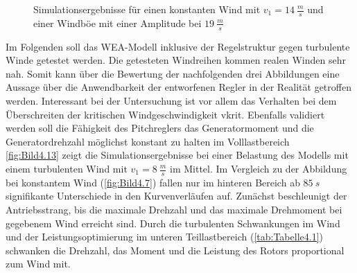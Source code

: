 \begin{figure}[H]
   \centering
   \caption[Windböensimulation bei schnellem Wind]{Simulationsergebnisse für einen konstanten Wind mit $v_1 = \SI{14}{\frac{m}{s}}$ und einer Windböe mit einer Amplitude bei $\SI{19}{\frac{m}{s}}$}
   \label{fig:Bild4.12}
\end{figure}


Im Folgenden soll das WEA-Modell inklusive der Regelstruktur gegen turbulente Winde getestet werden. Die getesteten Windreihen kommen realen Winden sehr nah. Somit kann über die Bewertung der nachfolgenden drei Abbildungen eine Aussage über die Anwendbarkeit der entworfenen Regler in der Realität getroffen werden. Interessant bei der Untersuchung ist vor allem das Verhalten bei dem Überschreiten der kritischen Windgeschwindigkeit \acs{vkrit}. Ebenfalls validiert werden soll die Fähigkeit des Pitchreglers das Generatormoment und die Generatordrehzahl möglichst konstant zu halten im Volllastbereich\\
\autoref{fig:Bild4.13} zeigt die Simulationsergebnisse bei einer Belastung des Modells mit einem turbulenten Wind mit $v_1 = \SI{8}{\frac{m}{s}}$ im Mittel. Im Vergleich zu der Abbildung bei konstantem Wind (\autoref{fig:Bild4.7}) fallen nur im hinteren Bereich ab \ca $\SI{85}{s}$ signifikante Unterschiede in den Kurvenverläufen auf. Zunächst beschleunigt der Antriebsstrang, bis die maximale Drehzahl und das maximale Drehmoment bei gegebenem Wind erreicht sind. Durch die turbulenten Schwankungen im Wind und der Leistungsoptimierung im unteren Teillastbereich (\vgl \autoref{tab:Tabelle4.1}) schwanken die Drehzahl, das Moment und die Leistung des Rotors proportional zum Wind mit. 

